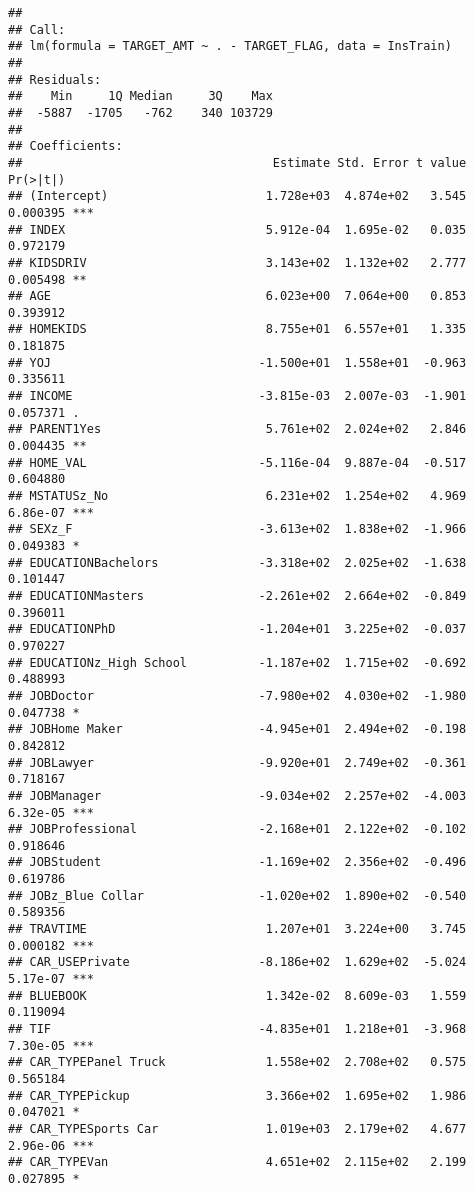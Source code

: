 \documentclass[]{article}
\begin{document}
\begin{verbatim}
## 
## Call:
## lm(formula = TARGET_AMT ~ . - TARGET_FLAG, data = InsTrain)
## 
## Residuals:
##    Min     1Q Median     3Q    Max 
##  -5887  -1705   -762    340 103729 
## 
## Coefficients:
##                                   Estimate Std. Error t value Pr(>|t|)    
## (Intercept)                      1.728e+03  4.874e+02   3.545 0.000395 ***
## INDEX                            5.912e-04  1.695e-02   0.035 0.972179    
## KIDSDRIV                         3.143e+02  1.132e+02   2.777 0.005498 ** 
## AGE                              6.023e+00  7.064e+00   0.853 0.393912    
## HOMEKIDS                         8.755e+01  6.557e+01   1.335 0.181875    
## YOJ                             -1.500e+01  1.558e+01  -0.963 0.335611    
## INCOME                          -3.815e-03  2.007e-03  -1.901 0.057371 .  
## PARENT1Yes                       5.761e+02  2.024e+02   2.846 0.004435 ** 
## HOME_VAL                        -5.116e-04  9.887e-04  -0.517 0.604880    
## MSTATUSz_No                      6.231e+02  1.254e+02   4.969 6.86e-07 ***
## SEXz_F                          -3.613e+02  1.838e+02  -1.966 0.049383 *  
## EDUCATIONBachelors              -3.318e+02  2.025e+02  -1.638 0.101447    
## EDUCATIONMasters                -2.261e+02  2.664e+02  -0.849 0.396011    
## EDUCATIONPhD                    -1.204e+01  3.225e+02  -0.037 0.970227    
## EDUCATIONz_High School          -1.187e+02  1.715e+02  -0.692 0.488993    
## JOBDoctor                       -7.980e+02  4.030e+02  -1.980 0.047738 *  
## JOBHome Maker                   -4.945e+01  2.494e+02  -0.198 0.842812    
## JOBLawyer                       -9.920e+01  2.749e+02  -0.361 0.718167    
## JOBManager                      -9.034e+02  2.257e+02  -4.003 6.32e-05 ***
## JOBProfessional                 -2.168e+01  2.122e+02  -0.102 0.918646    
## JOBStudent                      -1.169e+02  2.356e+02  -0.496 0.619786    
## JOBz_Blue Collar                -1.020e+02  1.890e+02  -0.540 0.589356    
## TRAVTIME                         1.207e+01  3.224e+00   3.745 0.000182 ***
## CAR_USEPrivate                  -8.186e+02  1.629e+02  -5.024 5.17e-07 ***
## BLUEBOOK                         1.342e-02  8.609e-03   1.559 0.119094    
## TIF                             -4.835e+01  1.218e+01  -3.968 7.30e-05 ***
## CAR_TYPEPanel Truck              1.558e+02  2.708e+02   0.575 0.565184    
## CAR_TYPEPickup                   3.366e+02  1.695e+02   1.986 0.047021 *  
## CAR_TYPESports Car               1.019e+03  2.179e+02   4.677 2.96e-06 ***
## CAR_TYPEVan                      4.651e+02  2.115e+02   2.199 0.027895 *  

\end{verbatim}
\end{document}
